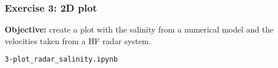 \begin{frame}[c, fragile]
\frametitle{Exercise 3: 2D plot}

\textbf{Objective:} create a plot with the salinity from a numerical model and the velocities taken from a HF radar system.

\vspace{1cm}

\exercise \verb|3-plot_radar_salinity.ipynb|

\end{frame}